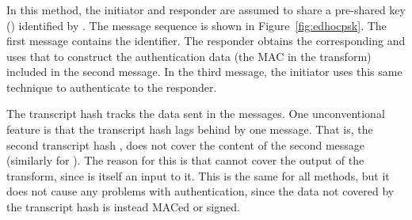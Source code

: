 \subsubsection{\mPskPsk{}}
In this method, the initiator and responder are assumed to share a pre-shared key (\mPsk) identified by \mIDPsk.
%
The message sequence is shown in Figure~\ref{fig:edhocpsk}.
%
The first message contains the \mIDPsk{} identifier.
%
The responder obtains the corresponding \mPsk{} and uses that to construct the authentication data (the MAC in the \mAead{} transform) included in the second message.
%
%
In the third message, the initiator uses this same technique to authenticate to the responder.
%

The transcript hash \mTH{} tracks the data sent in the messages.
%
One unconventional feature is that the transcript hash lags behind by one message. That is, the second transcript hash \mTHtwo{}, does not cover the content of the second message (similarly for \mTHthree). The reason for this is that \mTHtwo{} cannot cover the output of the \mAead{} transform, since \mTHtwo{} is itself an input to it.
%
This is the same for all methods, but it does not cause any problems with authentication, since the data not covered by the transcript hash is instead MACed or signed.
%

